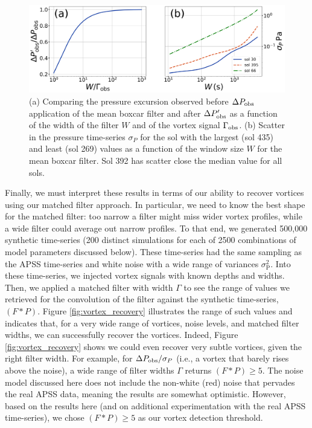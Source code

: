 \documentclass{aastex63}
\begin{document}
\begin{figure}
    \centering
    \includegraphics[width=\textwidth]{figures/Pobsprime-sigmaP_vs_W.png}
    \caption{(a) Comparing the pressure excursion observed before $\Delta P_{\rm obs}$ application of the mean boxcar filter and after $\Delta P_{\rm obs}^\prime$ as a function of the width of the filter $W$ and of the vortex signal $\Gamma_{\rm obs}$. (b) Scatter in the pressure time-series $\sigma_P$ for the sol with the largest (sol 435) and least (sol 269) values as a function of the window size $W$ for the mean boxcar filter. Sol 392 has scatter close the median value for all sols. }
    \label{fig:Pobsprime-sigmaP_vs_W}
\end{figure}

Finally, we must interpret these results in terms of our ability to recover vortices using our matched filter approach. In particular, we need to know the best shape for the matched filter: too narrow a filter might miss wider vortex profiles, while a wide filter could average out narrow profiles. To that end, we generated 500,000 synthetic time-series (200 distinct simulations for each of 2500 combinations of model parameters discussed below). These time-series had the same sampling as the APSS time-series and white noise with a wide range of variances $\sigma_\text{P}^2$. Into these time-series, we injected vortex signals with known depths and widths. Then, we applied a matched filter with width $\Gamma$ to see the range of values we retrieved for the convolution of the filter against the synthetic time-series, $\left( F \ast P \right)$. Figure \ref{fig:vortex_recovery} illustrates the range of such values and indicates that, for a very wide range of vortices, noise levels, and matched filter widths, we can successfully recover the vortices. Indeed, Figure \ref{fig:vortex_recovery} shows we could even recover very subtle vortices, given the right filter width. For example, for $\Delta P_{\rm obs}/\sigma_P$ (i.e., a vortex that barely rises above the noise), a wide range of filter widths $\Gamma$ returns $\left( F \ast P \right) \geq 5 $. The noise model discussed here does not include the non-white (red) noise that pervades the real APSS data, meaning the results are somewhat optimistic. However, based on the results here (and on additional experimentation with the real APSS time-series), we chose $\left( F \ast P \right) \geq 5 $ as our vortex detection threshold.
\end{document}
